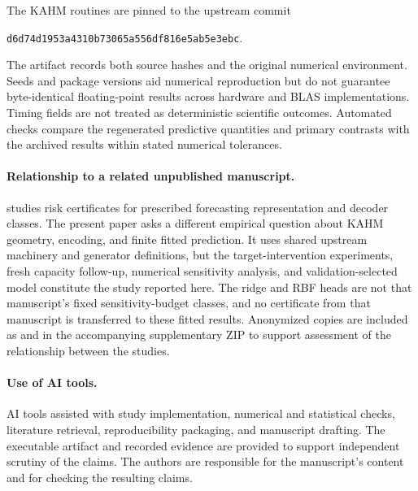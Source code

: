 \documentclass[10pt]{article}
\begin{document}
The KAHM routines are pinned to the upstream commit
\begin{center}\small\texttt{d6d74d1953a4310b73065a556df816e5ab5e3ebc}.\end{center}
The artifact records both
source hashes and the original numerical environment. Seeds and package
versions aid numerical reproduction but do not guarantee byte-identical
floating-point results across hardware and BLAS implementations. Timing
fields are not treated as deterministic scientific outcomes. Automated
checks compare the regenerated predictive quantities and primary contrasts
with the archived results within stated numerical tolerances.

\paragraph{Relationship to a related unpublished manuscript.}
\citet{Anonymous2026Certificates} studies risk certificates for
prescribed forecasting representation and decoder classes. The present
paper asks a different empirical question about KAHM geometry, encoding,
and finite fitted prediction. It uses shared upstream machinery and
generator definitions, but the target-intervention experiments, fresh
capacity follow-up, numerical sensitivity analysis, and validation-selected
model constitute the study reported here. The ridge and RBF heads are
not that manuscript's fixed sensitivity-budget classes, and no
certificate from that manuscript is transferred to these fitted results.
Anonymized copies are included as  and
 in the accompanying supplementary
ZIP to support assessment of the relationship between the studies.

\paragraph{Use of AI tools.}
AI tools assisted with study implementation, numerical and statistical
checks, literature retrieval, reproducibility packaging, and manuscript
drafting. The executable artifact and recorded evidence are provided to
support independent scrutiny of the claims. The authors are responsible
for the manuscript's content and for checking the resulting claims.



\clearpage
\appendix

\end{document}
